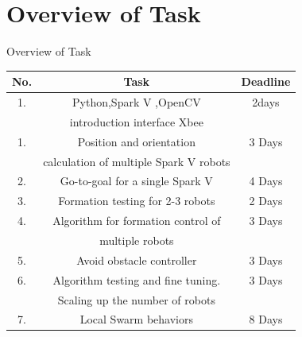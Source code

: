 \documentclass[11pt, a4paper]{beamer}
\begin{document}
\section{Overview of Task}
\begin{frame}{Overview of Task}

		\begin{tabular}{|c|c|c|}
			\hline
			\textbf{No.} & \textbf{Task} & \textbf{Deadline}
\\
\hline
1.& Python,Spark V ,OpenCV&2days\\& introduction interface Xbee&   \\

			
			\hline
			1. & Position and orientation & 3 Days \\&calculation of multiple Spark V robots & \\
			\hline
			2. &  Go-to-goal for a single Spark V & 4 Days\\
			\hline
			3. &  Formation testing for 2-3 robots & 2 Days\\
			\hline
			4. &  Algorithm for formation control of  & 3 Days\\ &multiple robots & \\
			\hline
			5. & Avoid obstacle controller & 3 Days\\
			\hline
			6. & Algorithm testing and fine tuning. & 3 Days\\ & Scaling up the number of robots & \\
			\hline
			7. & Local Swarm behaviors & 8 Days\\
			\hline
		\end{tabular}	
\end{frame}
\end{document}
